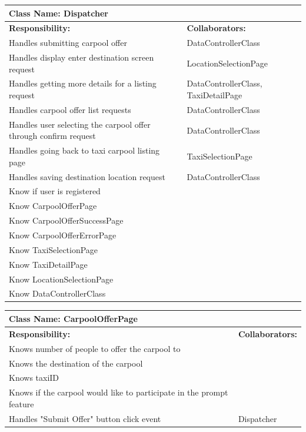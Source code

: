 \documentclass[]{article}
\begin{document}
	\begin{table}[H]
	\centering
	\begin{tabular}{|p{6cm}|p{6cm}|}
	\hline 
		\multicolumn{2}{|l|}{\textbf{Class Name: Dispatcher}} \\
	\hline
	\textbf{Responsibility:} & \textbf{Collaborators:} \\
	\hline
	Handles submitting carpool offer & DataControllerClass\\ \hline
	Handles display enter destination screen request & LocationSelectionPage\\ \hline
	Handles getting more details for a listing request & DataControllerClass, TaxiDetailPage\\ \hline
	Handles carpool offer list requests & DataControllerClass\\ \hline
	Handles user selecting the carpool offer through confirm request & DataControllerClass\\ \hline 
	Handles going back to taxi carpool listing page & TaxiSelectionPage\\ \hline
	Handles saving destination location request & DataControllerClass\\ \hline
	Know if user is registered & \\ \hline
	Know CarpoolOfferPage & \\ \hline 
	Know CarpoolOfferSuccessPage & \\ \hline 
	Know CarpoolOfferErrorPage & \\ \hline 
	Know TaxiSelectionPage & \\ \hline
	Know TaxiDetailPage & \\ \hline
	Know LocationSelectionPage & \\ \hline
	Know DataControllerClass & \\ \hline
	\end{tabular}
	\end{table}

	\begin{table}[H]
	\centering
	\begin{tabular}{|p{6cm}|p{6cm}|}
	\hline 
		\multicolumn{2}{|l|}{\textbf{Class Name: CarpoolOfferPage}} \\
	\hline
	\textbf{Responsibility:} & \textbf{Collaborators:} \\
	\hline
	Knows number of people to offer the carpool to &\\ \hline
	Knows the destination of the carpool &\\ \hline
	Knows taxiID &\\ \hline
	Knows if the carpool would like to participate in the prompt feature & \\ \hline
	Handles "Submit Offer" button click event  & Dispatcher\\ \hline
	\end{tabular}
	\end{table}
\end{document}

